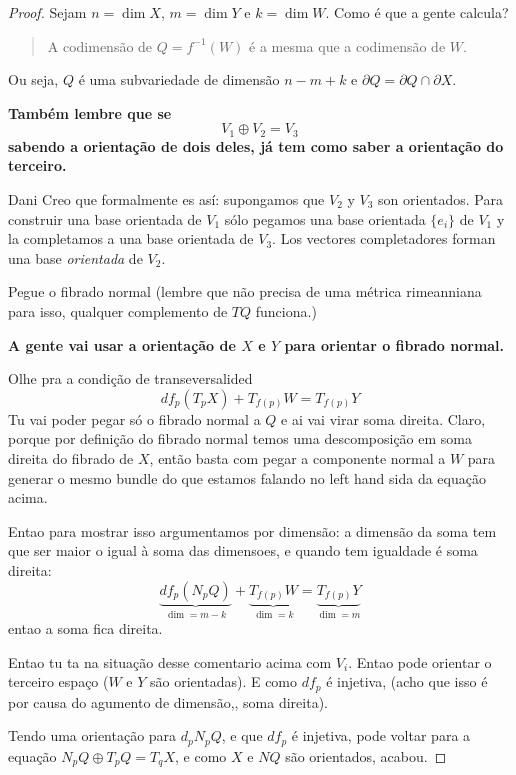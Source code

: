 \begin{proof}\leavevmode
Sejam \(n = \dim X\), \(m = \dim Y\) e \(k = \dim W\). Como é que a gente calcula?
\begin{quotation}
	A codimensão de \(Q= f^{-1}(W)\) é a mesma que a codimensão de \(W\).
\end{quotation}
Ou seja, \(Q\) é uma subvariedade de dimensão \(n - m + k \) e  \(\partial  Q=\partial Q \cap \partial X\).

\textbf{Também lembre que se} 
\[V_1 \oplus  V_2= V_3\]
\textbf{sabendo a orientação de dois deles, já tem como saber a orientação do terceiro.} 

\begin{thing6}{Dani}\leavevmode
	Creo que formalmente es así: supongamos que \(V_2\) y \(V_3\) son orientados. Para construir una base orientada de \(V_1\) sólo pegamos una base orientada \(\{e_i\}\) de \(V_1\) y la completamos a una base orientada de \(V_3\). Los vectores completadores forman una base \textit{orientada}  de \(V_2\).
\end{thing6}

Pegue o fibrado normal (lembre que não precisa de uma métrica rimeanniana para isso, qualquer complemento de \(TQ\) funciona.)

\textbf{A gente vai usar a orientação de \(X\) e \(Y\) para orientar o fibrado normal.} 

Olhe pra a condição de transeversalided
\[ df_p(T_pX) + T_{f(p)}W = T_{f(p)}Y\]
Tu vai poder pegar só o fibrado normal a \(Q\) e ai vai virar soma direita. Claro, porque por definição do fibrado normal temos uma descomposição em soma direita do fibrado de \(X\), então basta com pegar a componente normal a \(W\) para generar o mesmo bundle do que estamos falando no left hand sida da equação acima.

Entao para mostrar isso argumentamos por dimensão: a dimensão da soma tem que ser maior o igual à soma das dimensoes, e quando tem igualdade é soma direita:
\[\underbrace{df_p(N_pQ)}_{\dim=m-k} + \underbrace{T_{f(p)}W}_{\dim=k}= \underbrace{T_{f(p)}Y}_{\dim= m}\]
entao a soma fica direita.

Entao tu ta na situação desse comentario acima com \(V_i\). Entao pode orientar o terceiro espaço (\(W\) e \(Y\) são orientadas). E como \(df_p\) é injetiva, (acho que isso é por causa do agumento de dimensão,, soma direita).

Tendo uma orientação para \(d_p N_pQ\), e que \(df_p\)  é injetiva, pode voltar para a equação \(N_pQ \oplus  T_pQ=T_qX\), e como \(X\) e \(NQ\)  são orientados, acabou.
\end{proof}


